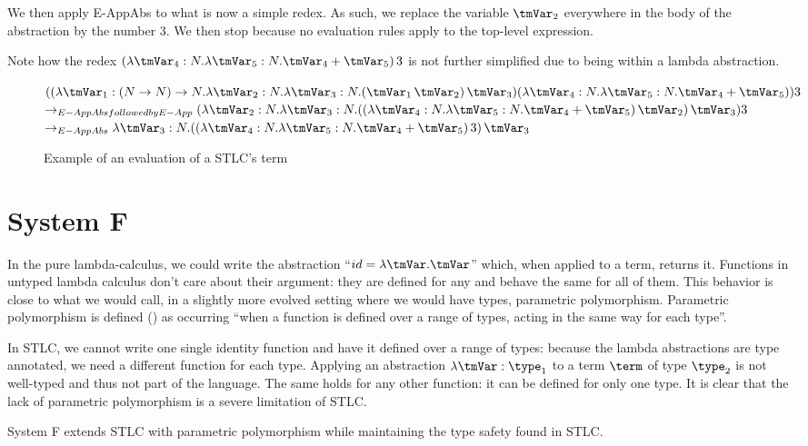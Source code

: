 We then apply E-AppAbs to what is now a simple redex. As such, we replace the variable $\tmVar_2$ everywhere in the body of the abstraction by the number $3$. We then stop because no evaluation rules apply to the top-level expression.

Note how the redex $(\lambda \tmVar_4:N. \lambda \tmVar_5:N. \tmVar_4 + \tmVar_5) \, 3$ is not further simplified due to being within a lambda abstraction.
\begin{figure}
  \centering
  $((\lambda \tmVar_1: (N \rightarrow N)\rightarrow N.\lambda \tmVar_2:N.\lambda \tmVar_3: N . (\tmVar_1 \, \tmVar_2)\,\tmVar_3) (\lambda \tmVar_4:N. \lambda \tmVar_5:N. \tmVar_4 + \tmVar_5)) 3$\\
$\rightarrow_{E-AppAbs followed by E-App}(\lambda \tmVar_2:N.\lambda \tmVar_3: N. ((\lambda \tmVar_4:N. \lambda \tmVar_5:N. \tmVar_4 + \tmVar_5) \, \tmVar_2)\,\tmVar_3) 3 $\\
$\rightarrow_{E-AppAbs} \lambda \tmVar_3: N. ((\lambda \tmVar_4:N. \lambda \tmVar_5:N. \tmVar_4 + \tmVar_5) \, 3)\,\tmVar_3 $
  \caption{Example of an evaluation of a STLC's term}
  \label{stlcexeval}
\end{figure}

\section{System F}
In the pure lambda-calculus, we could write the abstraction ``$id=\lambda\tmVar.\tmVar$'' which, when applied to a term, returns it. Functions in untyped lambda calculus don't care about their argument: they are defined for any and behave the same for all of them. This behavior is close to what we would call, in a slightly more evolved setting where we would have types, parametric polymorphism. Parametric polymorphism is defined (\cite{adhoc}) as occurring ``when a function is defined over a range of types, acting in the same way for each type''.

In STLC, we cannot write one single identity function and have it defined over a range of types: because the lambda abstractions are type annotated, we need a different function for each type. Applying an abstraction $\lambda \tmVar : \type_1$ to a term $\term$ of type $\type_2$ is not well-typed and thus not part of the language. The same holds for any other function: it can be defined for only one type. It is clear that the lack of parametric polymorphism is a severe limitation of STLC.

System F extends STLC with parametric polymorphism while maintaining the type safety found in STLC.

